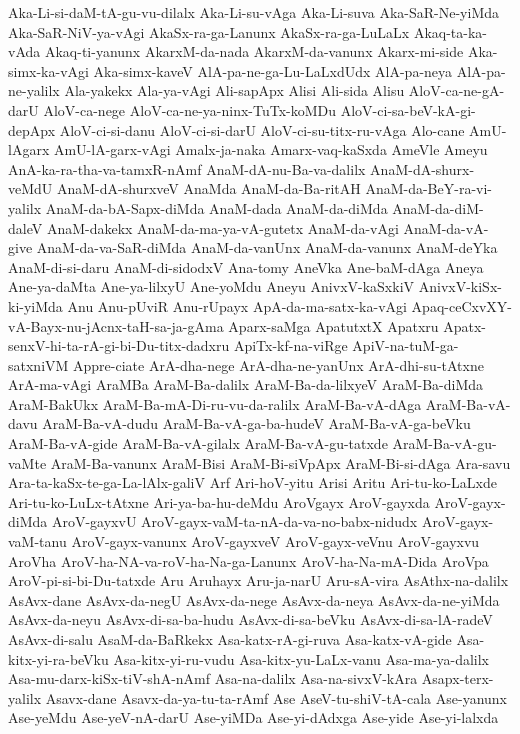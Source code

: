 {Aka-Li-si-daM-tA-gu-vu-dilalx
Aka-Li-su-vAga
Aka-Li-suva
Aka-SaR-Ne-yiMda
Aka-SaR-NiV-ya-vAgi
AkaSx-ra-ga-Lanunx
AkaSx-ra-ga-LuLaLx
Akaq-ta-ka-vAda
Akaq-ti-yanunx
AkarxM-da-nada
AkarxM-da-vanunx
Akarx-mi-side
Aka-simx-ka-vAgi
Aka-simx-kaveV
AlA-pa-ne-ga-Lu-LaLxdUdx
AlA-pa-neya
AlA-pa-ne-yalilx
Ala-yakekx
Ala-ya-vAgi
Ali-sapApx
Alisi
Ali-sida
Alisu
AloV-ca-ne-gA-darU
AloV-ca-nege
AloV-ca-ne-ya-ninx-TuTx-koMDu
AloV-ci-sa-beV-kA-gi-depApx
AloV-ci-si-danu
AloV-ci-si-darU
AloV-ci-su-titx-ru-vAga
Alo-cane
AmU-lAgarx
AmU-lA-garx-vAgi
Amalx-ja-naka
Amarx-vaq-kaSxda
AmeVle
Ameyu
AnA-ka-ra-tha-va-tamxR-nAmf
AnaM-dA-nu-Ba-va-dalilx
AnaM-dA-shurx-veMdU
AnaM-dA-shurxveV
AnaMda
AnaM-da-Ba-ritAH
AnaM-da-BeY-ra-vi-yalilx
AnaM-da-bA-Sapx-diMda
AnaM-dada
AnaM-da-diMda
AnaM-da-diM-daleV
AnaM-dakekx
AnaM-da-ma-ya-vA-gutetx
AnaM-da-vAgi
AnaM-da-vA-give
AnaM-da-va-SaR-diMda
AnaM-da-vanUnx
AnaM-da-vanunx
AnaM-deYka
AnaM-di-si-daru
AnaM-di-sidodxV
Ana-tomy
AneVka
Ane-baM-dAga
Aneya
Ane-ya-daMta
Ane-ya-lilxyU
Ane-yoMdu
Aneyu
AnivxV-kaSxkiV
AnivxV-kiSx-ki-yiMda
Anu
Anu-pUviR
Anu-rUpayx
ApA-da-ma-satx-ka-vAgi
Apaq-ceCxvXY-vA-Bayx-nu-jAcnx-taH-sa-ja-gAma
Aparx-saMga
ApatutxtX
Apatxru
Apatx-senxV-hi-ta-rA-gi-bi-Du-titx-dadxru
ApiTx-kf-na-viRge
ApiV-na-tuM-ga-satxniVM
Appre-ciate
ArA-dha-nege
ArA-dha-ne-yanUnx
ArA-dhi-su-tAtxne
ArA-ma-vAgi
AraMBa
AraM-Ba-dalilx
AraM-Ba-da-lilxyeV
AraM-Ba-diMda
AraM-BakUkx
AraM-Ba-mA-Di-ru-vu-da-ralilx
AraM-Ba-vA-dAga
AraM-Ba-vA-davu
AraM-Ba-vA-dudu
AraM-Ba-vA-ga-ba-hudeV
AraM-Ba-vA-ga-beVku
AraM-Ba-vA-gide
AraM-Ba-vA-gilalx
AraM-Ba-vA-gu-tatxde
AraM-Ba-vA-gu-vaMte
AraM-Ba-vanunx
AraM-Bisi
AraM-Bi-siVpApx
AraM-Bi-si-dAga
Ara-savu
Ara-ta-kaSx-te-ga-La-lAlx-galiV
Arf
Ari-hoV-yitu
Arisi
Aritu
Ari-tu-ko-LaLxde
Ari-tu-ko-LuLx-tAtxne
Ari-ya-ba-hu-deMdu
AroVgayx
AroV-gayxda
AroV-gayx-diMda
AroV-gayxvU
AroV-gayx-vaM-ta-nA-da-va-no-babx-nidudx
AroV-gayx-vaM-tanu
AroV-gayx-vanunx
AroV-gayxveV
AroV-gayx-veVnu
AroV-gayxvu
AroVha
AroV-ha-NA-va-roV-ha-Na-ga-Lanunx
AroV-ha-Na-mA-Dida
AroVpa
AroV-pi-si-bi-Du-tatxde
Aru
Aruhayx
Aru-ja-narU
Aru-sA-vira
AsAthx-na-dalilx
AsAvx-dane
AsAvx-da-negU
AsAvx-da-nege
AsAvx-da-neya
AsAvx-da-ne-yiMda
AsAvx-da-neyu
AsAvx-di-sa-ba-hudu
AsAvx-di-sa-beVku
AsAvx-di-sa-lA-radeV
AsAvx-di-salu
AsaM-da-BaRkekx
Asa-katx-rA-gi-ruva
Asa-katx-vA-gide
Asa-kitx-yi-ra-beVku
Asa-kitx-yi-ru-vudu
Asa-kitx-yu-LaLx-vanu
Asa-ma-ya-dalilx
Asa-mu-darx-kiSx-tiV-shA-nAmf
Asa-na-dalilx
Asa-na-sivxV-kAra
Asapx-terx-yalilx
Asavx-dane
Asavx-da-ya-tu-ta-rAmf
Ase
AseV-tu-shiV-tA-cala
Ase-yanunx
Ase-yeMdu
Ase-yeV-nA-darU
Ase-yiMDa
Ase-yi-dAdxga
Ase-yide
Ase-yi-lalxda
}
